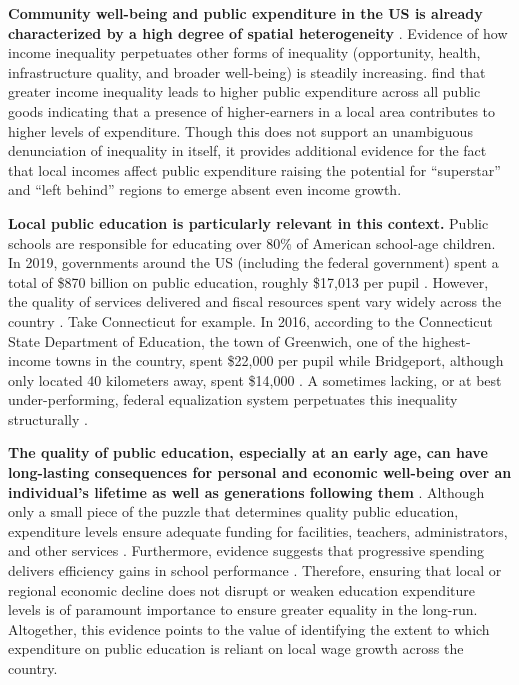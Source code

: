 \documentclass[
  10pt,
]{article}
\begin{document}
\textbf{Community well-being and public expenditure in the US is already
characterized by a high degree of spatial heterogeneity}
\autocite{manduca2025,obrien2025,feler2017,chetty2026}. Evidence of how
income inequality perpetuates other forms of inequality (opportunity,
health, infrastructure quality, and broader well-being) is steadily
increasing.
\autocite{chetty2016,logan2012,semuels2016,Avancena2021,flavin2009,boustanEffectRisingIncome2013}
find that greater income inequality leads to higher public expenditure
across all public goods indicating that a presence of higher-earners in
a local area contributes to higher levels of expenditure. Though this
does not support an unambiguous denunciation of inequality in itself, it
provides additional evidence for the fact that local incomes affect
public expenditure raising the potential for ``superstar'' and ``left
behind'' regions to emerge absent even income growth.

\textbf{Local public education is particularly relevant in this
context.} Public schools are responsible for educating over 80\% of
American school-age children. In 2019, governments around the US
(including the federal government) spent a total of \$870 billion on
public education, roughly \$17,013 per pupil
\autocite{nationalcenterforeducationstatistics2023,skinner2019}.
However, the quality of services delivered and fiscal resources spent
vary widely across the country \autocite{biolsi2022}. Take Connecticut
for example. In 2016, according to the Connecticut State Department of
Education, the town of Greenwich, one of the highest-income towns in the
country, spent \$22,000 per pupil while Bridgeport, although only
located 40 kilometers away, spent \$14,000 \autocite{semuels2016}. A
sometimes lacking, or at best under-performing, federal equalization
system perpetuates this inequality structurally
\autocite{beland2017,biasi2023,hoxby1998,mccabe2019,baker2016,aesa2024}.

\textbf{The quality of public education, especially at an early age, can
have long-lasting consequences for personal and economic well-being over
an individual's lifetime as well as generations following them}
\autocite{alfonso2020,zheng2022}. Although only a small piece of the
puzzle that determines quality public education, expenditure levels
ensure adequate funding for facilities, teachers, administrators, and
other services \autocite{baker2017,baker2025,jackson2016}. Furthermore,
evidence suggests that progressive spending delivers efficiency gains in
school performance \autocite{rauscher2022}. Therefore, ensuring that
local or regional economic decline does not disrupt or weaken education
expenditure levels is of paramount importance to ensure greater equality
in the long-run. Altogether, this evidence points to the value of
identifying the extent to which expenditure on public education is
reliant on local wage growth across the country.
\end{document}
